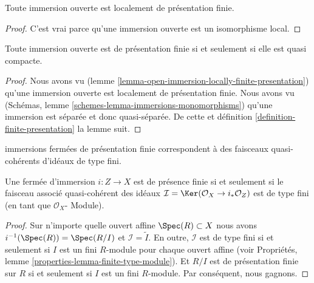 \begin{lemma}

\label{lemma-open-immersion-locally-finite-presentation}

Toute immersion ouverte est localement de présentation finie.

\end{lemma}

\begin{proof}

C'est vrai parce qu'une immersion ouverte est un isomorphisme local.

\end{proof}

\begin{lemma}

\label{lemma-quasi-compact-open-immersion-finite-presentation}
Toute immersion ouverte est de présentation finie si et seulement si elle est quasi compacte.
\end{lemma}

\begin{proof}
Nous avons vu (lemme \ref{lemma-open-immersion-locally-finite-presentation}) qu'une immersion ouverte est localement de présentation finie. Nous avons vu (Schémas, lemme \ref{schemes-lemma-immersions-monomorphisms}) qu'une immersion est séparée et donc quasi-séparée. De cette et définition \ref{definition-finite-presentation} la lemme suit.
\end{proof}

\begin{lemma}

\label{lemma-closed-immersion-finite-presentation}

\begin{slogan}

immersions fermées de présentation finie correspondent à des faisceaux quasi-cohérents d'idéaux de type fini.

\end{slogan}

Une fermée d'immersion $i : Z \to X$ est de présence finie si et seulement si le faisceau associé quasi-cohérent des idéaux
$\mathcal{I} = \Ker(\mathcal{O}_X \to i_*\mathcal{O}_Z)$
est de type fini (en tant que $\mathcal{O}_X$- Module).

\end{lemma}

\begin{proof}
Sur n'importe quelle ouvert affine $\Spec(R) \subset X$ nous avons $i^{-1}(\Spec(R)) = \Spec(R/I)$ et $\mathcal{I} = \widetilde{I}$. En outre, $\mathcal{I}$ est de type fini si et seulement si $I$ est un fini $R$-module pour chaque ouvert affine (voir Propriétés, lemme \ref{properties-lemma-finite-type-module}). Et $R/I$ est de présentation finie sur $R$ si et seulement si $I$ est un fini $R$-module. Par conséquent, nous gagnons.
\end{proof}

